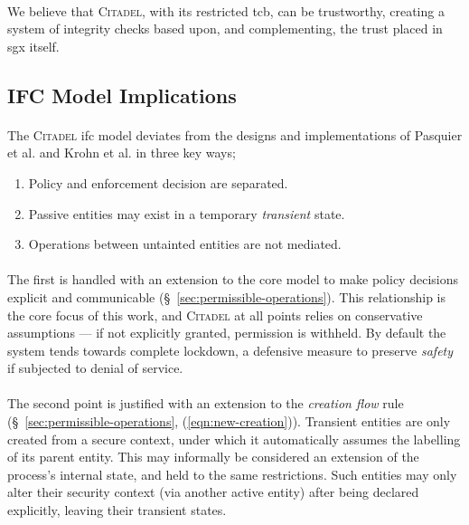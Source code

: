 \paragraph{} We believe that \textsc{Citadel}, with its restricted \acrshort{tcb}, can be trustworthy, creating a system of integrity checks based upon, and complementing, the trust placed in \acrshort{sgx} itself.

\subsection{IFC Model Implications}
\label{sec:ifc-model-implications}

\paragraph{} The \textsc{Citadel} \acrshort{ifc} model deviates from the designs and implementations of Pasquier et al. and Krohn et al. in three key ways;
\begin{enumerate}
    \item Policy and enforcement decision are separated.
    \item Passive entities may exist in a temporary \textit{transient} state.
    \item Operations between untainted entities are not mediated.
\end{enumerate}

\paragraph{} The first is handled with an extension to the core model to make policy decisions explicit and communicable (§~\ref{sec:permissible-operations}). This relationship is the core focus of this work, and \textsc{Citadel} at all points relies on conservative assumptions --- if not explicitly granted, permission is withheld. By default the system tends towards complete lockdown, a defensive measure to preserve \textit{safety} if subjected to denial of service.

\paragraph{} The second point is justified with an extension to the \textit{creation flow} rule (§~\ref{sec:permissible-operations}, (\ref{eqn:new-creation})). Transient entities are only created from a secure context, under which it automatically assumes the labelling of its parent entity. This may informally be considered an extension of the process's internal state, and held to the same restrictions. Such entities may only alter their security context (via another active entity) after being declared explicitly, leaving their transient states. 

